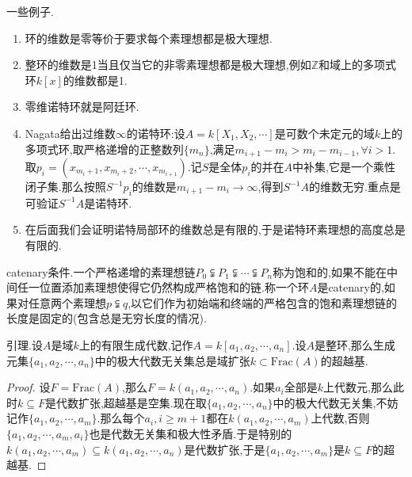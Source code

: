 一些例子.
\begin{enumerate}
	\item 环的维数是零等价于要求每个素理想都是极大理想.
	\item 整环的维数是1当且仅当它的非零素理想都是极大理想,例如$\mathbb{Z}$和域上的多项式环$k[x]$的维数都是1.
	\item 零维诺特环就是阿廷环.
	\item Nagata给出过维数$\infty$的诺特环:设$A=k[X_1,X_2,\cdots]$是可数个未定元的域$k$上的多项式环,取严格递增的正整数列$\{m_n\}$,满足$m_{i+1}-m_i>m_i-m_{i-1},\forall i>1$.取$p_i=(x_{m_i+1},x_{m_i+2},\cdots,x_{m_{i+1}})$.记$S$是全体$p_i$的并在$A$中补集,它是一个乘性闭子集.那么按照$S^{-1}p_i$的维数是$m_{i+1}-m_i\to\infty$,得到$S^{-1}A$的维数无穷.重点是可验证$S^{-1}A$是诺特环.
	\item 在后面我们会证明诺特局部环的维数总是有限的,于是诺特环素理想的高度总是有限的.
\end{enumerate}

catenary条件.一个严格递增的素理想链$P_0\subsetneqq P_1\subsetneqq\cdots\subsetneqq P_n$称为饱和的,如果不能在中间任一位置添加素理想使得它仍然构成严格饱和的链.称一个环$A$是catenary的,如果对任意两个素理想$p\subsetneqq q$,以它们作为初始端和终端的严格包含的饱和素理想链的长度是固定的(包含总是无穷长度的情况).

引理.设$A$是域$k$上的有限生成代数,记作$A=k[a_1,a_2,\cdots,a_n]$.设$A$是整环,那么生成元集$\{a_1,a_2,\cdots,a_n\}$中的极大代数无关集总是域扩张$k\subset\mathrm{Frac}(A)$的超越基.
\begin{proof}
	
	设$F=\mathrm{Frac}(A)$,那么$F=k(a_1,a_2,\cdots,a_n)$.如果$a_i$全部是$k$上代数元,那么此时$k\subseteq F$是代数扩张,超越基是空集.现在取$\{a_1,a_2,\cdots,a_n\}$中的极大代数无关集,不妨记作$\{a_1,a_2,\cdots,a_m\}$.那么每个$a_i,i\ge m+1$都在$k(a_1,a_2,\cdots,a_m)$上代数,否则$\{a_1,a_2,\cdots,a_m,a_i\}$也是代数无关集和极大性矛盾.于是特别的$k(a_1,a_2,\cdots,a_m)\subseteq k(a_1,a_2,\cdots,a_n)$是代数扩张,于是$\{a_1,a_2,\cdots,a_m\}$是$k\subseteq F$的超越基.
\end{proof}

